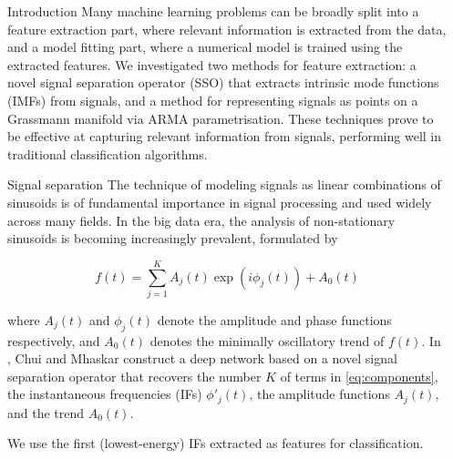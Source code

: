 \documentclass[final]{beamer}
\newlength{\sepwid}
\newlength{\onecolwid}
\begin{document}
\begin{frame}[t]
\begin{columns}[t]
\begin{column}{\onecolwid}
\begin{block}{Introduction}
    Many machine learning problems can be broadly split into a feature extraction part, where
    relevant information is extracted from the data, and a model fitting part, where a numerical
    model is trained using the extracted features. We investigated two methods for feature
    extraction: a novel signal separation operator (SSO) that extracts intrinsic mode functions
    (IMFs) from signals, and a method for representing signals as points on a Grassmann manifold via
    ARMA parametrisation.  These techniques prove to be effective at capturing relevant information
    from signals, performing well in traditional classification algorithms.
\end{block}


\begin{block}{Signal separation}
    The technique of modeling signals as linear combinations of sinusoids is of fundamental
    importance in signal processing and used widely across many fields. In the big data era, the
    analysis of non-stationary sinusoids is becoming increasingly prevalent, formulated by

    \begin{equation}\label{eq:components}
        f(t) = \sum_{j=1}^K A_j(t) \exp(i\phi_j(t)) + A_0(t)
    \end{equation}

    where $A_j(t)$ and $\phi_j(t)$ denote the amplitude and phase functions respectively, and
    $A_0(t)$ denotes the minimally oscillatory trend of $f(t)$. In \cite{chui_signal_2016}, Chui and
    Mhaskar construct a deep network based on a novel signal separation operator that recovers the
    number $K$ of terms in \ref{eq:components}, the instantaneous frequencies (IFs) $\phi'_j(t)$,
    the amplitude functions $A_j(t)$, and the trend $A_0(t)$.

    We use the first (lowest-energy) IFs extracted as features for classification.
\end{block}


\end{column} %

\begin{column}{\sepwid}\end{column} %


\end{columns}
\end{frame}
\end{document}
